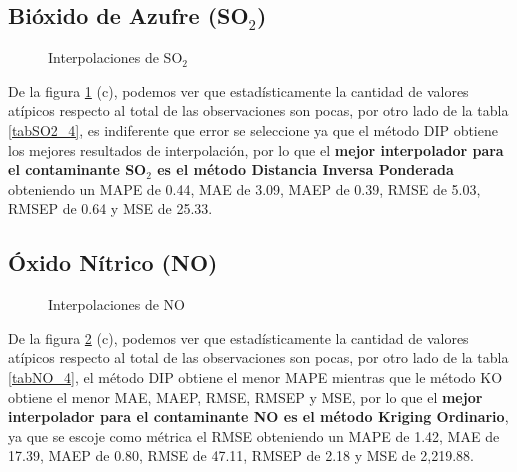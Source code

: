 \subsection{Bióxido de Azufre (SO$_{2}$)}
\begin{figure}[h]
\centering
{}
\caption{Interpolaciones de SO$_{2}$}
\label{final_7}
\end{figure}

De la figura \ref{final_7} (c), podemos ver que estadísticamente la cantidad de valores atípicos respecto al total de las observaciones son pocas, por otro lado de la tabla \ref{tabSO2_4}, es indiferente que error se seleccione ya que el método DIP obtiene los mejores resultados de interpolación, por lo que el \textbf{mejor interpolador para el contaminante SO$_{2}$ es el método Distancia Inversa Ponderada} obteniendo un MAPE de 0.44, MAE de 3.09, MAEP de 0.39, RMSE de 5.03, RMSEP de 0.64 y MSE de 25.33.

\subsection{Óxido Nítrico (NO)}
\begin{figure}[h]
\centering
{}
\caption{Interpolaciones de NO}
\label{final_8}
\end{figure}

De la figura \ref{final_8} (c), podemos ver que estadísticamente la cantidad de valores atípicos respecto al total de las observaciones son pocas, por otro lado de la tabla \ref{tabNO_4}, el método DIP obtiene el menor MAPE mientras que le método KO obtiene el menor MAE, MAEP, RMSE, RMSEP y MSE, por lo que el \textbf{mejor interpolador para el contaminante NO es el método Kriging Ordinario}, ya que se escoje como métrica el RMSE obteniendo un MAPE de 1.42, MAE de 17.39, MAEP de 0.80, RMSE de 47.11, RMSEP de 2.18 y MSE de 2,219.88.

